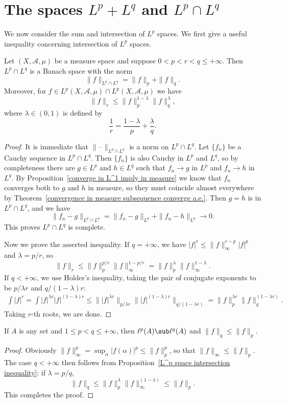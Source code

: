 \section{The spaces $L^p+L^q$ and $L^p\cap L^q$}
We now consider the sum and intersection of $L^p$ spaces. We first give a useful inequality concerning intersection of $L^p$ spaces.
\begin{proposition}\label{L^p space intersection inequality}
Let $(X,\mathcal{A},\mu)$ be a measure space and suppose $0<p<r<q\leq+\infty$. Then $L^p\cap L^q$ is a Banach space with the norm
\[\|f\|_{L^p\cap L^q}=\|f\|_p+\|f\|_q.\]
Moreover, for $f\in L^p(X,\mathcal{A},\mu)\cap L^p(X,\mathcal{A},\mu)$ we have
\[\|f\|_r\leq\|f\|_p^{1-\lambda}\|f\|_{q}^{\lambda},\]
where $\lambda\in(0,1)$ is defined by
\[\frac{1}{r}=\frac{1-\lambda}{p}+\frac{\lambda}{q}.\]
\end{proposition}
\begin{proof}
It is immediate that $\|\cdot\|_{L^p\cap L^q}$ is a norm on $L^p\cap L^q$. Let $\{f_n\}$ be a Cauchy sequence in $L^p\cap L^q$. Then $\{f_n\}$ is also Cauchy in $L^p$ and $L^q$, so by completeness there are $g\in L^p$ and $h\in L^q$ such that $f_n\to g$ in $L^p$ and $f_n\to h$ in $L^q$. By Proposition~\ref{converge in L^1 imply in measure} we know that $f_n$ converges both to $g$ and $h$ in measure, so they must coincide almost everywhere by Theorem~\ref{convergence in measure subsequence converge a.e.}. Then $g=h$ is in $L^p\cap L^q$, and we have
\[\|f_n-g\|_{L^p\cap L^q}=\|f_n-g\|_{L^p}+\|f_n-h\|_{L^q}\to 0.\]
This proves $L^p\cap L^q$ is complete.\par
Now we prove the asserted inequality. If $q=+\infty$, we have $|f|^r\leq\|f\|_\infty^{r-p}|f|^p$ and $\lambda=p/r$, so
\[\|f\|_r\leq\|f\|_p^{p/r}\|f\|_\infty^{1-p/r}=\|f\|_p^{\lambda}\|f\|_\infty^{1-\lambda}.\]
If $q<+\infty$, we use Holder's inequality, taking the pair of conjugate exponents to be $p/\lambda r$ and $q/(1-\lambda)r$:
\begin{align*}
\int|f|^r=\int|f|^{\lambda r}|f|^{(1-\lambda)r}\leq\||f|^{\lambda r}\|_{p/\lambda r}\||f|^{(1-\lambda)r}\|_{q/(1-\lambda r)}=\|f\|_p^{\lambda r}\|f\|_q^{(1-\lambda r)}.
\end{align*}
Taking $r$-th roots, we are done.
\end{proof}
\begin{corollary}
If $A$ is any set and $1\leq p<q\leq +\infty$, then $\ell^p(A)\sub\ell^q(A)$ and $\|f\|_q\leq\|f\|_p$.
\end{corollary}
\begin{proof}
Obviously $\|f\|_\infty^p=\sup_\alpha|f(\alpha)|^p\leq\|f\|_p^p$, so that $\|f\|_\infty\leq\|f\|_p$. The case $q<+\infty$ then follows from Proposition~\ref{L^p space intersection inequality}: if $\lambda=p/q$,
\[\|f\|_q\leq\|f\|_p^\lambda\|f\|_\infty^{(1-\lambda)}\leq\|f\|_p.\]
This completes the proof.
\end{proof}
